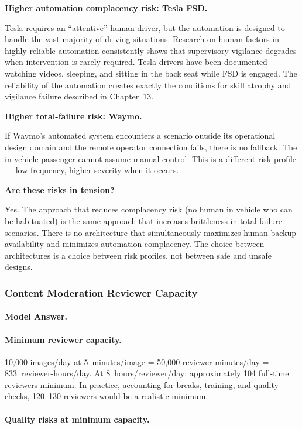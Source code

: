 \textbf{Higher automation complacency risk: Tesla FSD.}

Tesla requires an ``attentive'' human driver, but the automation is designed to handle the vast majority of driving situations. Research on human factors in highly reliable automation consistently shows that supervisory vigilance degrades when intervention is rarely required. Tesla drivers have been documented watching videos, sleeping, and sitting in the back seat while FSD is engaged. The reliability of the automation creates exactly the conditions for skill atrophy and vigilance failure described in Chapter~13.

\textbf{Higher total-failure risk: Waymo.}

If Waymo's automated system encounters a scenario outside its operational design domain and the remote operator connection fails, there is no fallback. The in-vehicle passenger cannot assume manual control. This is a different risk profile --- low frequency, higher severity when it occurs.

\textbf{Are these risks in tension?}

Yes. The approach that reduces complacency risk (no human in vehicle who can be habituated) is the same approach that increases brittleness in total failure scenarios. There is no architecture that simultaneously maximizes human backup availability and minimizes automation complacency. The choice between architectures is a choice between risk profiles, not between safe and unsafe designs.

\subsubsection{Content Moderation Reviewer Capacity}

\paragraph{Model Answer.}

\paragraph{Minimum reviewer capacity.}
10,000 images/day at 5~minutes/image = 50,000 reviewer-minutes/day = 833~reviewer-hours/day. At 8~hours/reviewer/day: approximately 104 full-time reviewers minimum. In practice, accounting for breaks, training, and quality checks, 120--130 reviewers would be a realistic minimum.

\paragraph{Quality risks at minimum capacity.}

